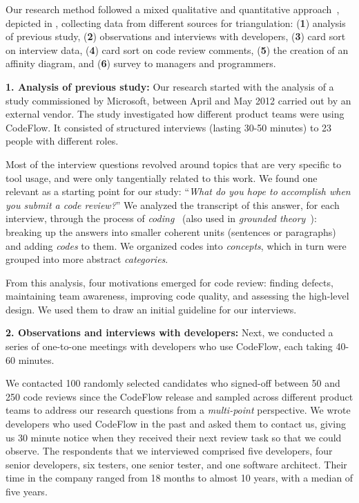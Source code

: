 Our research method followed a mixed qualitative and quantitative approach~\cite{creswell2009research}, depicted in
, collecting data from different sources for triangulation: (\textbf{1})
analysis of previous study, (\textbf{2}) observations and interviews with developers,
(\textbf{3}) card sort on interview data,  (\textbf{4}) card sort on code review comments, (\textbf{5})
the creation of an affinity diagram, and (\textbf{6}) survey to managers and
programmers.

\textbf{1. Analysis of previous study:} Our research started with the analysis of a
study commissioned by Microsoft, between April and May 2012 carried out by an
external vendor. The study investigated how different product teams were using
CodeFlow. It consisted of structured interviews (lasting 30-50 minutes) to 23
people with different roles.

Most of the interview questions revolved around topics that are very specific
to tool usage, and were only tangentially related to this work. We found one
relevant as a starting point for our study: ``\emph{What do you hope to accomplish
when you submit a code review?}'' We analyzed the transcript of this answer, for
each interview, through the process of \emph{coding}~\cite{berg2004qualitative} (also used in
\emph{grounded theory}~\cite{adolph2011using}): breaking up the answers into smaller coherent
units (sentences or paragraphs) and adding \emph{codes} to them. We organized codes
into \emph{concepts}, which in turn were grouped into more abstract \emph{categories}.

From this analysis, four motivations emerged for code review: finding defects,
maintaining team awareness, improving code quality, and assessing the
high-level design. We used them to draw an initial guideline for our
interviews.

\textbf{2. Observations and interviews with developers:} Next, we conducted a series of
one-to-one meetings with developers who use CodeFlow, each taking 40-60
minutes. 

We contacted 100 randomly selected candidates who signed-off between 50 and 250 code
reviews since the CodeFlow release and sampled across different product teams
to address our research questions from a \emph{multi-point} perspective. We wrote
developers who used CodeFlow in the past and asked them to contact us, giving
us 30 minute notice when they received their next review task so that we could
observe.  The respondents that we interviewed comprised five developers, four
senior developers, six testers, one senior tester, and one software architect.
Their time in the company ranged from 18 months to almost 10 years, with a
median of five years. 

